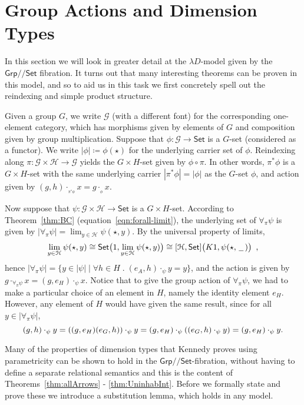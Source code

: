 \documentclass[a4paper,UKenglish]{lipics}
\theoremstyle{plain}
\newcommand{\msf}[1]{\mathsf{#1}} %
\newcommand{\Grp}{\msf{Grp}}
\newcommand{\Set}{\msf{Set}}
\newcommand{\blank}{\, \underline{\hspace{2mm}} \,}
\newcommand{\act}[1]{\cdot_{_{#1}}}
\newcommand{\GroupSet}[1]{[#1,\Set]}
\newcommand{\Lslice}[1]{#1/\!/\Set}
\newcommand{\GrpSet}{\Lslice{\Grp}}
\newcommand{\bbracket}[1]{\bigl( #1 \bigr)}
\begin{document}
\section{Group Actions and Dimension Types}\label{sec:MonSet}

In this section we will look in greater detail at the $\lambda
D$-model given by the $\GrpSet$ fibration. It turns out that many interesting theorems can be proven in this model, and so to aid us in this task we first concretely spell out the
reindexing and simple product structure.

Given a group $G$, we write $\mathcal{G}$ (with a different font) for the corresponding one-element category, which has morphisms given by elements of $G$ and composition given by group multiplication. Suppose that $\phi: \mathcal{G} \rightarrow \Set$ is a $G$-set
(considered as a functor). We write $|\phi| \coloneqq
\phi(\star)$ for the underlying carrier set of $\phi$.  Reindexing
along $\pi : \mathcal{G} \times \mathcal{H} \rightarrow \mathcal{G}$ yields the $G \times H$-set
given by $\phi \circ \pi$. In other words, $\pi^\ast\phi$ is a $G
\times H$-set with the same underlying carrier $|\pi^{\ast}\phi| =
|\phi|$ as the $G$-set $\phi$, and action given by $(g,h)
\act{\pi^{\ast}\phi} x = g \act{\phi} x$.

Now suppose that $\psi : \mathcal{G} \times \mathcal{H} \rightarrow\Set $ is a $G \times
H$-set. According to Theorem~\ref{thm:BC}
(equation~\eqref{eqn:forall-limit}), the underlying set of $\forall
_\pi \psi$ is given by $|\forall _\pi \psi| = \lim_{y\in \mathcal{H}}
\psi (\star, y)$. By the universal property of limits,
\[
 \lim_{y\in \mathcal{H}} \psi (\star, y) \cong \Set \bbracket{1, \lim_{y\in \mathcal{H}} \psi (\star, y)} \cong \GroupSet{\mathcal{H}}\bbracket{K1, \psi (\star, \blank)} \enspace \text,
\]
hence  $|\forall_\pi \psi | = \{y \in |\psi| \mathrel | \forall h\in H\;.\; (e_A, h) \cdot_{\psi} y = y \}$, and the action is given by $g \cdot_{\forall_\pi \psi} x = (g, e_H) \cdot_{\psi} x$.
%
Notice that to give the group action of $\forall_\pi \psi$, we had to
make a particular choice of an element in $H$, namely the identity
element $e_H$. However, any element of $H$ would have given the same
result, since for all $y \in |\forall_\pi \psi |$,
\[
   (g, h) \cdot_{\psi} y
 = ((g, e_H)(e_G, h)) \cdot_{\psi} y
 = (g, e_H) \cdot_{\psi} ((e_G, h) \cdot_{\psi} y)
 = (g, e_H) \cdot_{\psi} y
\text.\]

Many of the properties of dimension types that Kennedy proves using
parametricity can be shown to hold in the $\GrpSet$-fibration, without
having to define a separate relational semantics and this is the content of Theorems~\ref{thm:allArrows} - \ref{thm:UninhabInt}. Before we formally state and prove these we introduce a substitution lemma, which holds in any model.
\end{document}
